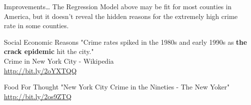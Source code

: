 \documentclass{beamer}
\begin{document}
\begin{frame}{Improvements\dots{}}
The Regression Model above may be fit for most counties in America, but it doesn't reveal the hidden reasons for the extremely high crime rate in some counties.

\begin{block}{Social Economic Reasons}
"Crime rates spiked in the 1980s and early 1990s as \textbf{the crack epidemic} hit the city."\\
\bigbreak
\small{Crime in New York City - Wikipedia\\ \url{http://bit.ly/2oYXTQQ}}
\end{block}

\begin{block}{Food For Thought}
"New York City Crime in the Nineties - The New Yoker"\\
\bigbreak
\small{\url{http://bit.ly/2os9ZTQ}}
\end{block}

\end{frame}
\end{document}
